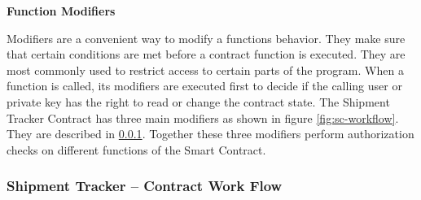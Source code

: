 \textbf{Function Modifiers}

Modifiers are a convenient way to modify a functions behavior. They make sure that certain conditions are met before a contract function is executed. They are most commonly used to restrict access to certain parts of the program. When a function is called, its modifiers are executed first to decide if the calling user or private key has the right to read or change the contract state. The Shipment Tracker Contract has three main modifiers as shown in figure \ref{fig:sc-workflow}. They are described in \ref{CWF}. Together these three modifiers perform authorization checks on different functions of the Smart Contract.
\clearpage

\subsubsection{Shipment Tracker – Contract Work Flow} \label{CWF}
